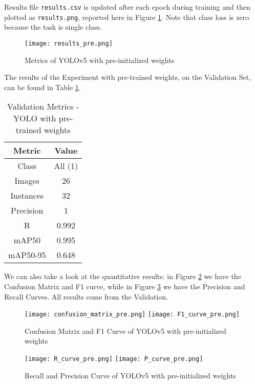 Results file \texttt{results.csv} is updated after each epoch during training and then plotted as \texttt{results.png}, reported here in Figure \ref{fig:resultspre}. Note that class loss is zero because the task is single class.


\begin{figure}[h!]
  \centering
  \texttt{[image: results\_pre.png]}
  \caption{Metrics of YOLOv5 with pre-initialized weights}
  \label{fig:resultspre}
\end{figure}

The results of the Experiment with pre-trained weights, on the Validation Set, can be found in Table \ref{tab:table2}.

\begin{table}[h!]
    \centering
    \begin{tabular}{c|c}
    Metric & Value\\
    \hline
    Class & All (1)\\
    Images & 26 \\
    Instances & 32\\
    Precision & 1 \\  
    R & 0.992 \\
    mAP50 & 0.995\\
    mAP50-95 & 0.648\\
    \end{tabular}
    \caption{Validation Metrics - YOLO with pre-trained weights}
    \label{tab:table2}
\end{table}	

We can also take a look at the quantitative results: in Figure \ref{fig:Cmatrixyolopre} we have the Confusion Matrix and F1 curve, while in Figure \ref{fig:RPCurveyolopre} we have the Precision and Recall Curves. All results come from the Validation.

\begin{figure}[h!]
  \centering
  \texttt{[image: confusion\_matrix\_pre.png]}
  \texttt{[image: F1\_curve\_pre.png]}
  \caption{Confusion Matrix and F1 Curve of YOLOv5 with pre-initialized weights}
  \label{fig:Cmatrixyolopre}
\end{figure}


\begin{figure}[h!]
  \centering
  \texttt{[image: R\_curve\_pre.png]}
  \texttt{[image: P\_curve\_pre.png]}
  \caption{Recall and Precision Curve of YOLOv5 with pre-initialized weights}
  \label{fig:RPCurveyolopre}
\end{figure}

